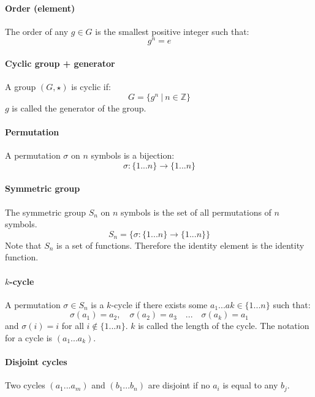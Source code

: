\documentclass{scrartcl}
\newcommand{\Z}{\mathbb{Z}}
\begin{document}
\paragraph{Order (element)}
The order of any $ g \in G $ is the smallest positive integer such that:
\begin{equation}
g^{n} = e
\end{equation}

\paragraph{Cyclic group + generator}
A group $ (G, \star) $ is cyclic if:
\begin{equation}
G = \{ g^{n} \ | \ n \in \Z \} 
\end{equation}
$ g $ is called the generator of the group.

\paragraph{Permutation}
A permutation $ \sigma $ on $ n $ symbols is a bijection:
\begin{equation}
\sigma : \{1...n\} \to \{1...n\}
\end{equation}

\paragraph{Symmetric group}
The symmetric group $ S_{n} $ on $ n $ symbols is the set of all permutations of $ n $ symbols.
\begin{equation}
S_{n} = \{\sigma : \{1...n\} \to \{1...n\}\}
\end{equation}
Note that $ S_{n} $ is a set of functions. Therefore the identity element is the identity function.

\paragraph{$ k $-cycle}
A permutation $ \sigma \in S_{n} $ is a $ k $-cycle if there exists some $ a_{1}...a{k}  \in \{1...n\} $ such that:
\begin{equation}
\sigma(a_{1}) = a_{2}, \quad \sigma(a_{2}) = a_{3} \quad ... \quad \sigma(a_{k}) = a_{1}
\end{equation}
and $ \sigma(i) = i $ for all $ i \notin \{1...n\} $. $ k $ is called the length of the cycle. The notation for a cycle is $ (a_{1}...a_{k}) $.

\paragraph{Disjoint cycles}
Two cycles $ (a_{1}...a_{m}) $ and $ (b_{1}...b_{n}) $ are disjoint if no $ a_{i} $ is equal to any $ b_{j} $.
\end{document}
